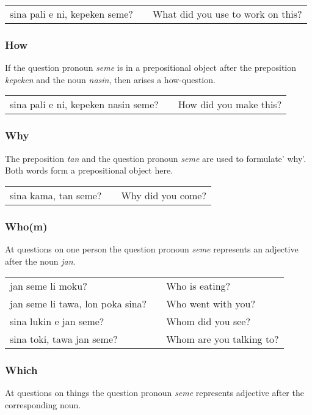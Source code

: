 \begin{supertabular}{p{5,5cm}|ll}
    sina pali e ni, kepeken seme? &  & What did you use to work on this? \\
\end{supertabular}

\subsubsection*{How}
If the question pronoun \textit{seme} is in a prepositional object after the preposition \textit{kepeken} and the noun \textit{nasin}, then arises a how-question.

\begin{supertabular}{p{5,5cm}|ll}
    sina pali e ni, kepeken nasin seme? &  & How did you make this? \\
\end{supertabular}

\subsubsection*{Why}
The preposition \textit{tan} and the question pronoun \textit{seme} are used to formulate' why'.
Both words form a prepositional object here.

\begin{supertabular}{p{5,5cm}|ll}
    sina kama, tan seme? &  & Why did you come? \\
\end{supertabular}

\subsubsection*{Who(m)}
At questions on one person the question pronoun \textit{seme} represents an adjective after the noun \textit{jan}.

\begin{supertabular}{p{5,5cm}|ll}
    jan seme li moku?                &  & Who is eating?           \\
    jan seme li tawa, lon poka sina? &  & Who went with you?       \\
    sina lukin e jan seme?           &  & Whom did you see?        \\
    sina toki, tawa jan seme?        &  & Whom are you talking to? \\
\end{supertabular}

\subsubsection*{Which}
At questions on things the question pronoun \textit{seme} represents adjective after the corresponding noun.

